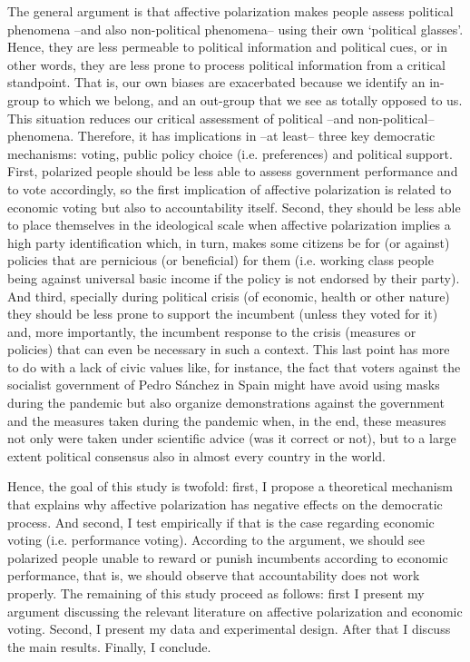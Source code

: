 \documentclass[a4paper, svgnames]{article}
\begin{document}
The general argument is that affective polarization makes people assess political phenomena --and also non-political phenomena-- using their own `political glasses'. Hence, they are less permeable to political information and political cues, or in other words, they are less prone to process political information from a critical standpoint. That is, our own biases are exacerbated because we identify an in-group to which we belong, and an out-group that we see as totally opposed to us. This situation reduces our critical assessment of political --and non-political-- phenomena. Therefore, it has implications in --at least-- three key democratic mechanisms: voting, public policy choice (i.e. preferences) and political support. First, polarized people should be less able to assess government performance and to vote accordingly, so the first implication of affective polarization is related to economic voting but also to accountability itself. Second, they should be less able to place themselves in the ideological scale when affective polarization implies a high party identification which, in turn, makes some citizens be for (or against) policies that are pernicious (or beneficial) for them (i.e. working class people being against universal basic income if the policy is not endorsed by their party). And third, specially during political crisis (of economic, health or other nature) they should be less prone to support the incumbent (unless they voted for it) and, more importantly, the incumbent response to the crisis (measures or policies) that can even be necessary in such a context. This last point has more to do with a lack of civic values like, for instance, the fact that voters against the socialist government of Pedro Sánchez in Spain might have avoid using masks during the pandemic but also organize demonstrations against the government and the measures taken during the pandemic when, in the end, these measures not only were taken under scientific advice (was it correct or not), but to a large extent political consensus also in almost every country in the world.

Hence, the goal of this study is twofold: first, I propose a theoretical mechanism that explains why affective polarization has negative effects on the democratic process. And second, I test empirically if that is the case regarding economic voting (i.e. performance voting). According to the argument, we should see polarized people unable to reward or punish incumbents according to economic performance, that is, we should observe that accountability does not work properly. The remaining of this study proceed as follows: first I present my argument discussing the relevant literature on affective polarization and economic voting. Second, I present my data and experimental design. After that I discuss the main results. Finally, I conclude.
\end{document}
